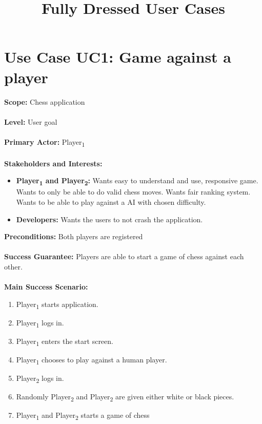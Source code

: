 \documentclass[a4paper,10pt]{article}
\title{Fully Dressed User Cases}
\author{}
\begin{document}
\maketitle

\section*{Use Case UC1: Game against a player}

\textbf{Scope:} Chess application
\\\\
\textbf{Level:} User goal
\\\\
\textbf{Primary Actor:} \texorpdfstring{Player\textsubscript{1}}{Player 1}
\\\\
\textbf{Stakeholders and Interests:} 
\begin{itemize}
 \item \textbf{\texorpdfstring{Player\textsubscript{1}}{Player 1} and \texorpdfstring{Player\textsubscript{2}}{Player 2}:} Wants easy to understand and use, responsive game. Wants to only be able to do valid chess moves. Wants fair ranking system. Wants to be able to play against a AI with chosen difficulty.
 \item \textbf{Developers:} Wants the users to not crash the application.
\end{itemize}
\textbf{Preconditions:} Both players are registered
\\\\
\textbf{Success Guarantee:} Players are able to start a game of chess against each other. 
\\\\
\textbf{Main Success Scenario:}
\begin{enumerate}
 \item \texorpdfstring{Player\textsubscript{1}}{Player 1} starts application.
 \item \texorpdfstring{Player\textsubscript{1}}{Player 1} logs in.
 \item \texorpdfstring{Player\textsubscript{1}}{Player 1} enters the start screen.
 \item \texorpdfstring{Player\textsubscript{1}}{Player 1} chooses to play against a human player.
 \item \texorpdfstring{Player\textsubscript{2}}{Player 2} logs in.
 \item Randomly \texorpdfstring{Player\textsubscript{2}}{Player 2} and \texorpdfstring{Player\textsubscript{2}}{Player 2} are given either white or black pieces.
 \item \texorpdfstring{Player\textsubscript{1}}{Player 1} and \texorpdfstring{Player\textsubscript{2}}{Player 2} starts a game of chess
 \end{enumerate}
\end{document}
